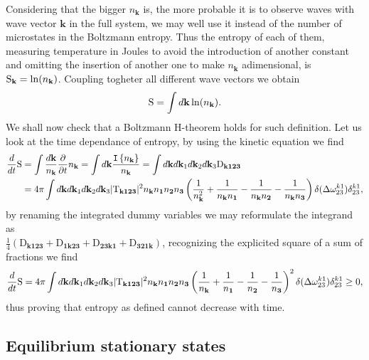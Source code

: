 Considering that the bigger $n_\mathbf{k}$ is, the more probable it is to observe waves with wave vector $\mathbf{k}$ in the full system, 
we may well use it instead of the number 
of microstates in the Boltzmann entropy. Thus the entropy of each of them, measuring temperature in Joules to avoid the introduction of another constant
and omitting the insertion of another one to make $n_\mathbf{k}$ adimensional, is $\mathrm{S}_\mathbf{k} = \ln(n_\mathbf{k})$. 
Coupling togheter all different wave vectors we obtain 
\begin{equation}
    \mathrm{S} = \int d\mathbf{k} \ln(n_\mathbf{k}).
\end{equation}
We shall now check that a Boltzmann H-theorem holds for such definition. Let us look at the time dependance of entropy, by using the kinetic equation we find
\begin{align}
    \frac{d}{dt} \mathrm{S} &= \int \frac{d\mathbf{k}}{n_\mathbf{k}} \frac{\partial}{\partial t} n_\mathbf{k} = \int d\mathbf{k} \frac{\mathtt{I}\left\{n_\mathbf{k}\right\}}{n_\mathbf{k}} = 
    \int d\mathbf{k} d\mathbf{k}_1 d\mathbf{k}_2 d\mathbf{k}_3 \mathrm{D}_\mathbf{k123}\\
    &= 4\pi \int d\mathbf{k} d\mathbf{k}_1 d\mathbf{k}_2 d\mathbf{k}_3 |\mathrm{T}_{\mathbf{k123}}|^2 n_\mathbf{k}n_\mathbf{1}n_\mathbf{2}n_\mathbf{3} 
     \left(\frac{1}{n_\mathbf{k}^2} + \frac{1}{n_\mathbf{k} n_\mathbf{1}}-\frac{1}{n_\mathbf{k} n_\mathbf{2}}-\frac{1}{n_\mathbf{k} n_\mathbf{3}}\right)
    \delta(\Delta{\omega}^{k1}_{23})\delta^{k1}_{23},
\end{align}
by renaming the integrated dummy variables we may reformulate the integrand as \\ 
$\frac{1}{4} \left(\mathrm{D}_\mathbf{k123}+\mathrm{D}_\mathbf{1k23}+\mathrm{D}_\mathbf{23k1}+
\mathrm{D}_\mathbf{321k} \right)$, recognizing the explicited square of a sum of fractions we find
\begin{equation}
    \frac{d}{dt} \mathrm{S} = 4\pi \int d\mathbf{k} d\mathbf{k}_1 d\mathbf{k}_2 d\mathbf{k}_3 |\mathrm{T}_{\mathbf{k123}}|^2 n_\mathbf{k}n_\mathbf{1}n_\mathbf{2}n_\mathbf{3} 
     \left( \frac{1}{n_\mathbf{k}} + \frac{1}{n_\mathbf{1}}-\frac{1}{n_\mathbf{2}}-\frac{1}{n_\mathbf{3}}\right)^2 
    \delta(\Delta{\omega}^{k1}_{23})\delta^{k1}_{23}\ge 0,
\end{equation}
thus proving that entropy as defined cannot decrease with time. \\

\subsection{Equilibrium stationary states}

